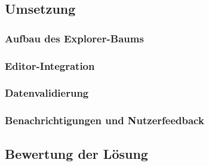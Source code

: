 \subsection{Umsetzung}
\label{sec:vfs-umsetzung}


\subsubsection{Aufbau des Explorer-Baums}
\label{subsec:explorer-baum}


\subsubsection{Editor-Integration}
\label{subsec:editor-integration}

\subsubsection{Datenvalidierung}
\label{subsec:vfs-validierung}

\subsubsection{Benachrichtigungen und Nutzerfeedback}
\label{subsec:vfs-benachrichtigungen}

\subsection{Bewertung der Lösung}
\label{sec:vfs-bewertung}

